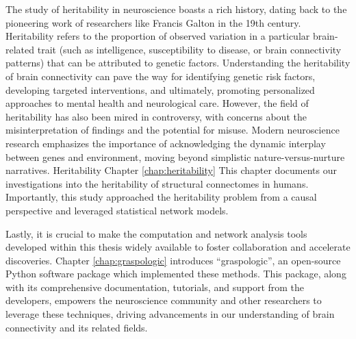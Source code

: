 The study of heritability in neuroscience boasts a rich history, dating back to the pioneering work of researchers like Francis Galton in the 19th century. Heritability refers to the proportion of observed variation in a particular brain-related trait (such as intelligence, susceptibility to disease, or brain connectivity patterns) that can be attributed to genetic factors. Understanding the heritability of brain connectivity can pave the way for identifying genetic risk factors, developing targeted interventions, and ultimately, promoting personalized approaches to mental health and neurological care. However, the field of heritability has also been mired in controversy, with concerns about the misinterpretation of findings and the potential for misuse. Modern neuroscience research emphasizes the importance of acknowledging the dynamic interplay between genes and environment, moving beyond simplistic nature-versus-nurture narratives. Heritability Chapter \ref{chap:heritability} This chapter documents our investigations into the heritability of structural connectomes in humans. Importantly, this study approached the heritability problem from a causal perspective and leveraged statistical network models.

Lastly, it is crucial to make the computation and network analysis tools developed within this thesis widely available to foster collaboration and accelerate discoveries. Chapter \ref{chap:graspologic} introduces ``graspologic'', an open-source Python software package which implemented these methods. This package, along with its comprehensive documentation, tutorials, and support from the developers, empowers the neuroscience community and other researchers to leverage these techniques, driving advancements in our understanding of brain connectivity and its related fields.